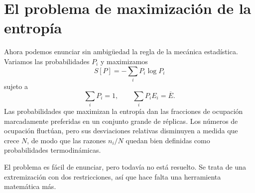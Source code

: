 \begin{classroomqa}
\end{classroomqa}

\section{El problema de maximización de la entropía}

Ahora podemos enunciar sin ambigüedad la regla de la mecánica estadística. Variamos las probabilidades \(P_i\) y maximizamos
\begin{equation}
 S[P]=-\sum_iP_i\log P_i
 \label{eq:sm3-maximize-entropy}
\end{equation}
sujeto a
\begin{equation}
 \sum_iP_i=1,
 \qquad
 \sum_iP_iE_i=\overline E.
 \label{eq:sm3-maxent-constraints}
\end{equation}
Las probabilidades que maximizan la entropía dan las fracciones de ocupación marcadamente preferidas en un conjunto grande de réplicas. Los números de ocupación fluctúan, pero sus desviaciones relativas disminuyen a medida que crece \(N\), de modo que las razones \(n_i/N\) quedan bien definidas como probabilidades termodinámicas.

\begin{classroomqa}
\end{classroomqa}

El problema es fácil de enunciar, pero todavía no está resuelto. Se trata de una extremización con dos restricciones, así que hace falta una herramienta matemática más.

